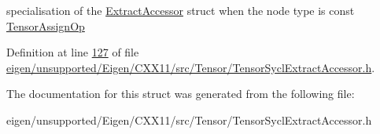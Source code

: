 specialisation of the \hyperlink{struct_eigen_1_1_tensor_sycl_1_1internal_1_1_extract_accessor}{Extract\+Accessor} struct when the node type is const \hyperlink{class_eigen_1_1_tensor_assign_op}{Tensor\+Assign\+Op} 

Definition at line \hyperlink{eigen_2unsupported_2_eigen_2_c_x_x11_2src_2_tensor_2_tensor_sycl_extract_accessor_8h_source_l00127}{127} of file \hyperlink{eigen_2unsupported_2_eigen_2_c_x_x11_2src_2_tensor_2_tensor_sycl_extract_accessor_8h_source}{eigen/unsupported/\+Eigen/\+C\+X\+X11/src/\+Tensor/\+Tensor\+Sycl\+Extract\+Accessor.\+h}.



The documentation for this struct was generated from the following file\+:\begin{DoxyCompactItemize}
\item 
eigen/unsupported/\+Eigen/\+C\+X\+X11/src/\+Tensor/\+Tensor\+Sycl\+Extract\+Accessor.\+h\end{DoxyCompactItemize}
